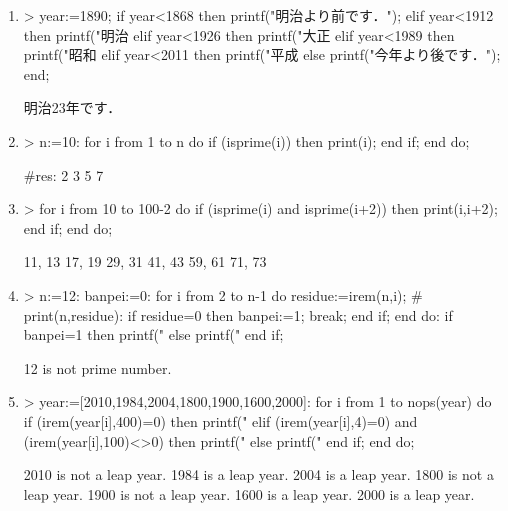 \begin{enumerate}
\item
\begin{MapleInput}
> year:=1890; 
  if year<1868 then printf("明治より前です．\n"); 
  elif year<1912 then printf("明治%
  elif year<1926 then printf("大正%
  elif year<1989 then printf("昭和%
  elif year<2011 then printf("平成%
  else printf("今年より後です．\n"); 
  end;
\end{MapleInput}
\begin{MapleError}
明治23年です．
\end{MapleError}

\item
\begin{MapleInput}
> n:=10:
  for i from 1 to n do 
    if (isprime(i)) then 
      print(i); 
    end if; 
  end do;
\end{MapleInput}
\begin{MapleError}
#res: 2 3 5 7
\end{MapleError}

\item
\begin{MapleInput}
> for i from 10 to 100-2 do 
    if (isprime(i) and isprime(i+2)) then 
      print(i,i+2);
    end if; 
  end do;
\end{MapleInput}
\begin{MapleError}
                                    11, 13
                                    17, 19
                                    29, 31
                                    41, 43
                                    59, 61
                                    71, 73
\end{MapleError}

\item
\begin{MapleInput}
> n:=12: 
  banpei:=0:
  for i from 2 to n-1 do 
    residue:=irem(n,i); 
    # print(n,residue): 
    if residue=0 then 
      banpei:=1; 
      break; 
    end if; 
  end do: 
  if banpei=1 then 
    printf("%
  else 
    printf("%
  end if;
\end{MapleInput}
\begin{MapleError}
12 is not prime number.
\end{MapleError}

\item
\begin{MapleInput}
> year:=[2010,1984,2004,1800,1900,1600,2000]: 
  for i from 1 to nops(year) do 
    if (irem(year[i],400)=0) then 
      printf("%
    elif (irem(year[i],4)=0) and (irem(year[i],100)<>0) then
      printf("%
    else printf("%
    end if;
  end do;
\end{MapleInput}
\begin{MapleError}
2010 is not a leap year. 
1984 is a leap year. 
2004 is a leap year. 
1800 is not a leap year. 
1900 is not a leap year. 
1600 is a leap year. 
2000 is a leap year.
\end{MapleError}


\end{enumerate}
